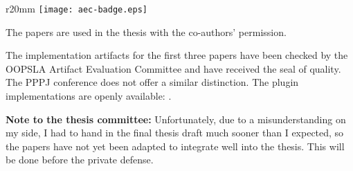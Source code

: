\begin{wrapfigure}{r}{20mm}
  \vspace{0.7em}
  \centering
  \texttt{[image: aec-badge.eps]}
  \vspace{-4em}
\end{wrapfigure}

The papers are used in the thesis with the co-authors' permission.

The implementation artifacts for the first three papers have been checked by the OOPSLA Artifact Evaluation Committee and have received the seal of quality. The PPPJ conference does not offer a similar distinction.
The plugin implementations are openly available: \cite{miniboxing-www,ildl-plugin,ldl-staging-plugin,ldl-value-class-plugin,miniboxing-plugin}.


\textbf{Note to the thesis committee:} Unfortunately, due to a misunderstanding on my side, I had to hand in the final thesis draft much sooner than I expected, so the papers have not yet been adapted to integrate well into the thesis. This will be done before the private defense.
